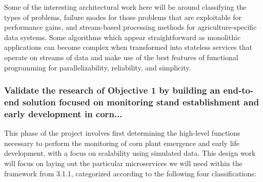 \documentclass[11pt]{article}
\begin{document}
Some of the interesting architectural work here will be around classifying the types of problems, failure 
modes for those problems that are exploitable for performance gains, and stream-based processing 
methods for agriculture-specific data systems.  Some algorithms which appear straightforward as 
monolithic applications can become complex when transformed into stateless services that operate on 
streams of data and make use of the best features of functional programming for parallelizability, 
reliability, and simplicity.

\subsubsection{Validate the research of Objective 1 by building an end-to-end solution focused on monitoring stand 
	establishment and early development in corn... }  

This phase of the project involves first determining the high-level functions necessary to perform the monitoring 
of corn plant emergence and early life development, with a focus on scalability using simulated data.  This design 
work will focus on laying out the particular microservices we will need within the framework from 3.1.1, 
categorized according to the following four classifications:
\end{document}

